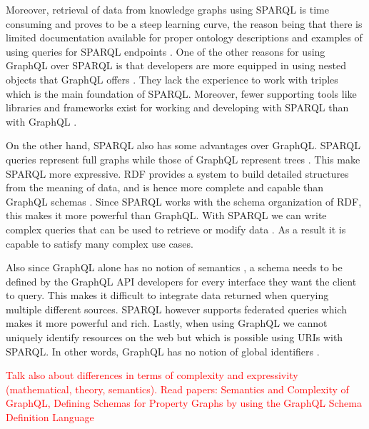 Moreover, retrieval of data from knowledge graphs using SPARQL is time consuming and proves to be a steep learning curve, the reason being that there is limited documentation available for proper ontology descriptions and examples of using queries for SPARQL endpoints \cite{Angele2022}. One of the other reasons for using GraphQL over SPARQL is that developers are more equipped in using nested objects that GraphQL offers \cite{Taelman2018}. They lack the experience to work with triples which is the main foundation of SPARQL. Moreover, fewer supporting tools like libraries and frameworks exist for working and developing with SPARQL than with GraphQL \cite{Taelman2018}. 

On the other hand, SPARQL also has some advantages over GraphQL. SPARQL queries represent full graphs while those of GraphQL represent trees \cite{Taelman2018}. This make SPARQL more expressive. RDF provides a system to build detailed structures from the meaning of data, and is hence more complete and capable than GraphQL schemas \cite{Dresslar2019}. Since SPARQL works with the schema organization of RDF, this makes it more powerful than GraphQL. With SPARQL we can write complex queries that can be used to retrieve or modify data \cite{Angele2022}. As a result it is capable to satisfy many complex use cases.

Also since GraphQL alone has no notion of semantics \cite{Taelman2018}, a schema needs to be defined by the GraphQL API developers for every interface they want the client to query. This makes it difficult to integrate data returned when querying multiple different sources. SPARQL however supports federated queries which makes it more powerful and rich. Lastly, when using GraphQL we cannot uniquely identify resources on the web but which is possible using URIs with SPARQL. In other words, GraphQL has no notion of global identifiers \cite{Taelman2018}.

\textcolor{red}{Talk also about differences in terms of complexity and expressivity (mathematical, theory, semantics). Read papers: Semantics and Complexity of GraphQL, Defining Schemas for Property Graphs by using the GraphQL Schema Definition Language}
